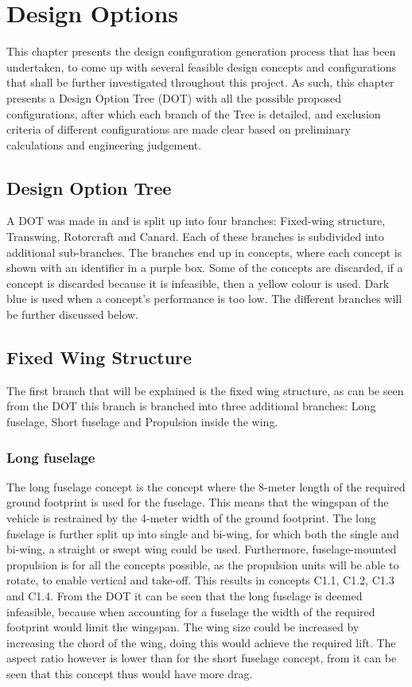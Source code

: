\chapter{Design Options}\label{ch:design_options}
This chapter presents the design configuration generation process that has been undertaken, to come up with several feasible design concepts and configurations that shall be further investigated throughout this project.
As such, this chapter presents a Design Option Tree (DOT) with all the possible proposed configurations, after which each branch of the Tree is detailed, and exclusion criteria of different configurations are made clear based on preliminary calculations and engineering judgement.

\section{Design Option Tree}
A DOT was made in  and is split up into four branches: Fixed-wing structure, Transwing, Rotorcraft and Canard.
Each of these branches is subdivided into additional sub-branches.
The branches end up in concepts, where each concept is shown with an identifier in a purple box.
Some of the concepts are discarded, if a concept is discarded because it is infeasible, then a yellow colour is used.
Dark blue is used when a concept's performance is too low.
The different branches will be further discussed below.


\section{Fixed Wing Structure}
\label{sec:DesignOptions_FixedWingStructure}
The first branch that will be explained is the fixed wing structure, as can be seen from the DOT this branch is branched into three additional branches: Long fuselage, Short fuselage and Propulsion inside the wing. 


\subsection{Long fuselage}
The long fuselage concept is the concept where the 8-meter length of the required ground footprint is used for the fuselage.
This means that the wingspan of the vehicle is restrained by the 4-meter width of the ground footprint.
The long fuselage is further split up into single and bi-wing, for which both the single and bi-wing, a straight or swept wing could be used.
Furthermore, fuselage-mounted propulsion is for all the concepts possible, as the propulsion units will be able to rotate, to enable vertical and take-off.
This results in concepts C1.1, C1.2, C1.3 and C1.4. From the DOT it can be seen that the long fuselage is deemed infeasible, because when accounting for a fuselage the width of the required footprint would limit the wingspan.
The wing size could be increased by increasing the chord of the wing, doing this would achieve the required lift.
The aspect ratio however is lower than for the short fuselage concept, from  it can be seen that this concept thus would have more drag.


